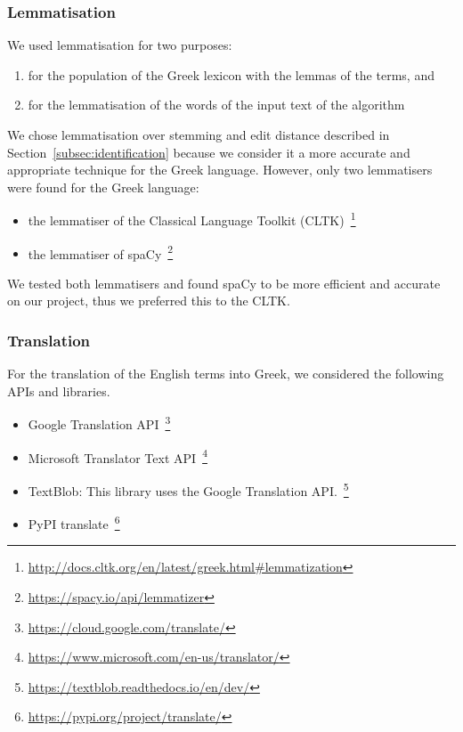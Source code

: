 \subsubsection{Lemmatisation}
\label{subsubsec:lemmatisation}

We used lemmatisation for two purposes:

\begin{enumerate}
 \item for the population of the Greek lexicon with the lemmas of the terms, and
 \item for the lemmatisation of the words of the input text of the algorithm
\end{enumerate}

We chose lemmatisation over stemming and edit distance described in Section~\ref{subsec:identification} because we consider it a more accurate
and appropriate technique for the Greek language.
However, only two lemmatisers were found for the Greek language:

\begin{itemize}
 \item the lemmatiser of the Classical Language Toolkit (CLTK)~\footnote{\url{http://docs.cltk.org/en/latest/greek.html#lemmatization}}
 \item the lemmatiser of spaCy~\footnote{\url{https://spacy.io/api/lemmatizer}}
\end{itemize}

We tested both lemmatisers and found spaCy to be more efficient and accurate
on our project, thus we preferred this to the CLTK.

\subsubsection{Translation}
\label{subsubsec:translation}

For the translation of the English terms into Greek,
we considered the following APIs and libraries.

\begin{itemize}
 \item Google Translation API~\footnote{\url{https://cloud.google.com/translate/}}
 \item Microsoft Translator Text API~\footnote{\url{https://www.microsoft.com/en-us/translator/}}
 \item TextBlob: This library uses the Google Translation API.~\footnote{\url{https://textblob.readthedocs.io/en/dev/}}
 \item PyPI translate~\footnote{\url{https://pypi.org/project/translate/}}
\end{itemize}

